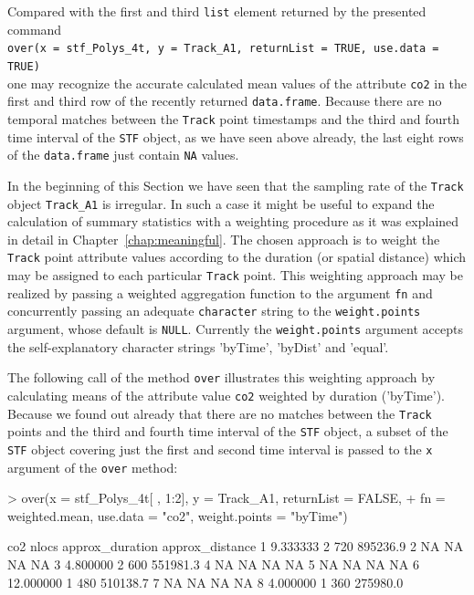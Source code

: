 \documentclass[12pt, oneside, a4paper]{scrbook}
\let\code=\texttt
\begin{document}
Compared with the first and third \code{list} element returned by the presented command \\ \code{over(x = stf\_Polys\_4t, y = Track\_A1, returnList = TRUE, use.data = TRUE)} \\ one may recognize the accurate calculated mean values of the attribute \code{co2} in the first and third row of the recently returned \code{data.frame}. 
Because there are no temporal matches between the \code{Track} point timestamps and the third and fourth time interval of the \code{STF} object, as we have seen above already, the last eight rows of the \code{data.frame} just contain \code{NA} values.
\par\medskip
In the beginning of this Section we have seen that the sampling rate of the \code{Track} object \code{Track\_A1} is irregular. 
In such a case it might be useful to expand the calculation of summary statistics with a weighting procedure as it was explained in detail in Chapter~\ref{chap:meaningful}. 
The chosen approach is to weight the \code{Track} point attribute values according to the duration (or spatial distance) which may be assigned to each particular \code{Track} point. 
This weighting approach may be realized by passing a weighted aggregation function to the argument \code{fn} and concurrently passing an adequate \code{character} string to the \code{weight.points} argument, whose default is \code{NULL}. 
Currently the \code{weight.points} argument accepts the self-explanatory character strings 'byTime', 'byDist' and 'equal'.
\par\medskip
The following call of the method \code{over} illustrates this weighting approach by calculating means of the attribute value \code{co2} weighted by duration ('byTime'). 
Because we found out already that there are no matches between the \code{Track} points and the third and fourth time interval of the \code{STF} object, a subset of the \code{STF} object covering just the first and second time interval is passed to the \code{x} argument of the \code{over} method:

\begin{small}
\begin{Schunk}
\begin{Sinput}
> over(x = stf_Polys_4t[ , 1:2], y = Track_A1, returnList = FALSE, 
+      fn = weighted.mean, use.data = "co2", weight.points = "byTime")
\end{Sinput}
\begin{Soutput}
        co2 nlocs approx_duration approx_distance
1  9.333333     2             720        895236.9
2        NA    NA              NA              NA
3  4.800000     2             600        551981.3
4        NA    NA              NA              NA
5        NA    NA              NA              NA
6 12.000000     1             480        510138.7
7        NA    NA              NA              NA
8  4.000000     1             360        275980.0
\end{Soutput}
\end{Schunk}
\end{small}
\end{document}
